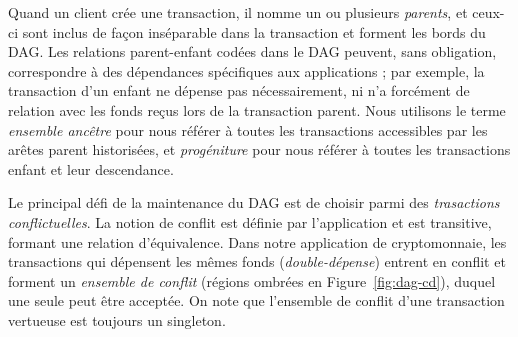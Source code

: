 Quand un client crée une transaction, il nomme un ou plusieurs \emph{parents}, et ceux-ci sont inclus de façon inséparable dans la transaction et forment les bords du DAG\@.
Les relations parent-enfant codées dans le DAG peuvent, sans obligation, correspondre à des dépendances spécifiques aux applications ; par exemple, la transaction d'un enfant ne dépense pas nécessairement, ni n'a forcément de relation avec les fonds reçus lors de la transaction parent.
Nous utilisons le terme \emph{ensemble ancêtre} pour nous référer à toutes les transactions accessibles par les arêtes parent historisées, et \emph{progéniture} pour nous référer à toutes les transactions enfant et leur descendance.

Le principal défi de la maintenance du DAG est de choisir parmi des \emph{trasactions conflictuelles}.
La notion de conflit est définie par l'application et est transitive, formant une relation d'équivalence.
Dans notre application de cryptomonnaie, les transactions qui dépensent les mêmes fonds (\emph{double-dépense}) entrent en conflit et forment un \emph{ensemble de conflit}
(régions ombrées en Figure~\ref{fig:dag-cd}), duquel une seule peut être acceptée.
On note que l'ensemble de conflit d'une transaction vertueuse est toujours un singleton.
 
